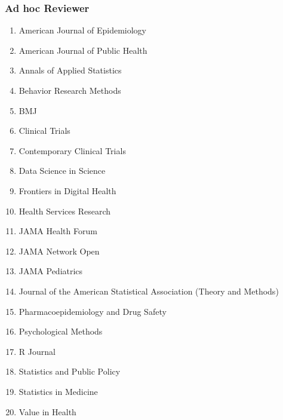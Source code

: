 \documentclass[letterpaper,11pt]{article} %
\begin{document}
    \subsubsection*{Ad hoc Reviewer}
	\begin{enumerate}[noitemsep,leftmargin = 1.25em]
		\item[] American Journal of Epidemiology
		\item[] American Journal of Public Health
		\item[] Annals of Applied Statistics
		\item[] Behavior Research Methods
        \item[] BMJ
        \item[] Clinical Trials
        \item[] Contemporary Clinical Trials
        \item[] Data Science in Science
		\item[] Frontiers in Digital Health
        \item[] Health Services Research
        \item[] JAMA Health Forum
        \item[] JAMA Network Open
        \item[] JAMA Pediatrics
		\item[] Journal of the American Statistical Association (Theory and Methods)
		\item[] Pharmacoepidemiology and Drug Safety
		\item[] Psychological Methods
		\item[] R Journal
		\item[] Statistics and Public Policy
		\item[] Statistics in Medicine
		\item[] Value in Health
	\end{enumerate}
	
\end{document}
